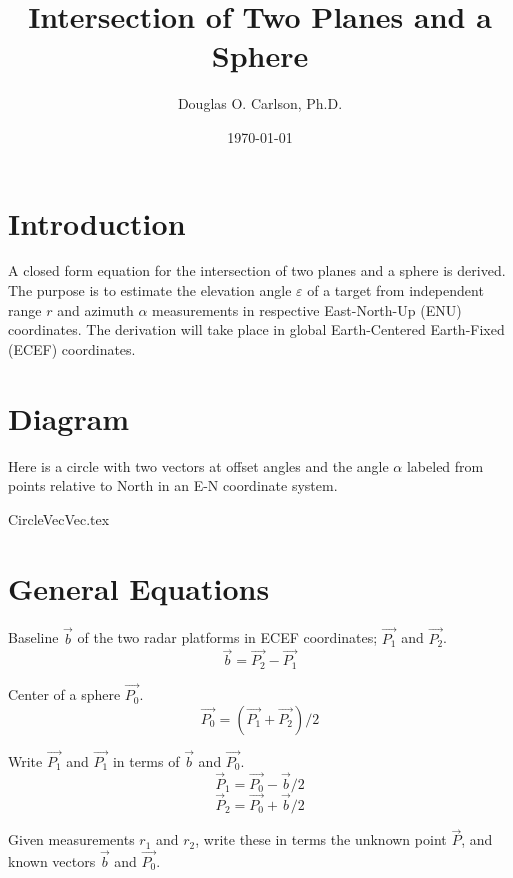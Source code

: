 \documentclass[12pt]{article}
\title{\textbf{Intersection of Two Planes and a Sphere}}
\author{Douglas O. Carlson, Ph.D.}
\date{\today}
\begin{document}
	\maketitle
	
	\section{Introduction}
	A closed form equation for the intersection of two planes and a sphere is derived. The purpose is to estimate the elevation angle $\varepsilon$ of a target from independent range $r$ and azimuth $\alpha$ measurements in respective East-North-Up (ENU) coordinates. The derivation will take place in global Earth-Centered Earth-Fixed (ECEF) coordinates.
	
	\section{Diagram}
	Here is a circle with two vectors at offset angles and the angle $\alpha$ labeled from points relative to North in an E-N coordinate system.
	
	\begin{center}
		{CircleVecVec.tex}
	\end{center}
	
	\section{General Equations}
	Baseline $\vec{b}$ of the two radar platforms in ECEF coordinates; $\vec{P_1}$ and $\vec{P_2}$.
	\begin{equation}
		\vec{b} = \vec{P_2} - \vec{P_1}
	\end{equation}

	Center of a sphere $\vec{P_0}$.
	\begin{equation}
		\vec{P_0} = (\vec{P_1} + \vec{P_2})/2
	\end{equation}
	
	Write $\vec{P_1}$ and $\vec{P_1}$ in terms of $\vec{b}$ and $\vec{P_0}$.
	\begin{equation}
		\vec{P}_1 = \vec{P_0} - \vec{b} / 2
	\end{equation}	
	\begin{equation}
		\vec{P}_2 = \vec{P_0} + \vec{b} / 2
	\end{equation}	
	
	Given measurements $r_1$ and $r_2$, write these in terms the unknown point 
	$\vec{P}$, and known vectors $\vec{b}$ and $\vec{P_0}$.
	
\end{document}
